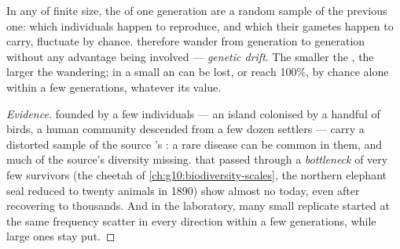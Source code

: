 \begin{proposition}\label{prop:g12:selection-drift-speciation:drift}
In any  of finite size, the  of one generation are a
random sample of the previous one: which individuals happen to
reproduce, and which  their gametes happen to carry, fluctuate
by chance.   therefore wander from generation to
generation without any advantage being involved --- \emph{genetic
drift}. The smaller the , the larger
the wandering; in a small  an  can be lost, or reach
100\%, by chance alone within a few generations, whatever its value.
\end{proposition}
\begin{proof}[Evidence]
 founded by a few individuals --- an island colonised by a
handful of birds, a human community descended from a few dozen
settlers --- carry a distorted sample of the source 's
: a rare disease  can be common in them, and much of the
source's diversity missing.  that passed through a
\emph{bottleneck} of very few survivors (the cheetah of
\cref{ch:g10:biodiversity-scales}, the northern elephant seal reduced
to twenty animals in 1890) show almost no  today,
even after recovering to thousands. And in the laboratory, many small
replicate  started at the same frequency scatter in every
direction within a few generations, while large ones stay put.
\end{proof}

